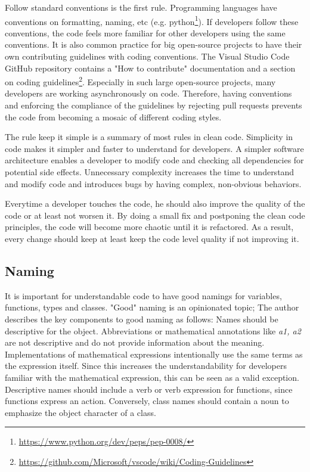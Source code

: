 Follow standard conventions is the first rule. Programming languages have conventions on formatting, naming, etc (e.g. python\footnote{\url{https://www.python.org/dev/peps/pep-0008/}}). If developers follow these conventions, the code feels more familiar for other developers using the same conventions. It is also common practice for big open-source projects to have their own contributing guidelines with coding conventions. The Visual Studio Code GitHub repository contains a "How to contribute" documentation and a section on coding guidelines\footnote{\url{https://github.com/Microsoft/vscode/wiki/Coding-Guidelines}}.  Especially in such large open-source projects, many developers are working asynchronously on code. Therefore, having conventions and enforcing the compliance of the guidelines by rejecting pull requests prevents the code from becoming a mosaic of different coding styles.

The rule keep it simple is a summary of most rules in clean code. Simplicity in code makes it simpler and faster to understand for developers. A simpler software architecture enables a developer to modify code and checking all dependencies for potential side effects. Unnecessary complexity increases the time to understand and modify code and introduces bugs by having complex, non-obvious behaviors.


Everytime a developer touches the code, he should also improve the quality of the code or at least not worsen it. By doing a small fix and postponing the clean code principles, the code will become more chaotic until it is refactored. As a result, every change should keep at least keep the code level quality if not improving it.  

\subsection{Naming}\label{sec:naming}
It is important for understandable code to have good namings for variables, functions, types and classes. "Good" naming is an opinionated topic; The author describes the key components to good naming as follows:
Names should be descriptive for the object. Abbreviations or mathematical annotations like \textit{a1, a2} are not descriptive and do not provide information about the meaning. Implementations of mathematical expressions intentionally use the same terms as the expression itself. Since this increases the understandability for developers familiar with the mathematical expression, this can be seen as a valid exception. 
Descriptive names should include a verb or verb expression for functions, since functions express an action. Conversely, class names should contain a noun to emphasize the object character of a class.

